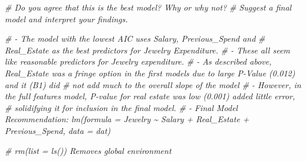 \documentclass[
]{article}
\newenvironment{Shaded}{\begin{snugshade}}{\end{snugshade}}
\newcommand{\CommentTok}[1]{\textcolor[rgb]{0.56,0.35,0.01}{\textit{#1}}}
\begin{document}
\begin{Shaded}
\begin{Highlighting}[]
\CommentTok{\# Do you agree that this is the best model? Why or why not?}
\CommentTok{\# Suggest a final model and interpret your findings.}


\CommentTok{\# {-} The model with the lowest AIC uses Salary, Previous\_Spend and }
\CommentTok{\#   Real\_Estate as the best predictors for Jewelry Expenditure. }
\CommentTok{\# {-} These all seem like reasonable predictors for Jewelry expenditure.  }
\CommentTok{\# {-} As described above, Real\_Estate was a fringe option in the first models due to large P{-}Value (0.012) and it (B1) did }
\CommentTok{\#   not add much to the overall slope of the model  }
\CommentTok{\# {-} However, in the full features model, P{-}value for real estate was low (0.001) added little error,}
\CommentTok{\#   solidifying it for inclusion in the final model.  }
\CommentTok{\# {-} Final Model Recommendation: lm(formula = Jewelry \textasciitilde{} Salary + Real\_Estate + Previous\_Spend, data = dat)}






\CommentTok{\# rm(list = ls())      Removes global environment}
\end{Highlighting}
\end{Shaded}
\end{document}
